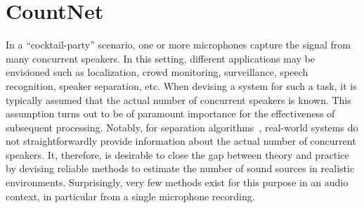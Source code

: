\chapter{CountNet}
\label{cha:countnet}



In a ``cocktail-party'' scenario, one or more microphones capture the signal from many concurrent speakers. In this setting, different applications may be envisioned such as localization, crowd monitoring, surveillance, speech recognition, speaker separation, etc.
When devising a system for such a task, it is typically assumed that the actual number of concurrent speakers is known.
This assumption turns out to be of paramount importance for the effectiveness of subsequent processing.
Notably, for separation algorithms~\cite{common10},
real-world systems do not straightforwardly provide information about the actual number of concurrent speakers.
It, therefore, is desirable to close the gap between theory and practice by devising reliable methods to estimate the number of sound sources in realistic environments.
Surprisingly, very few methods exist for this purpose in an audio context, in particular from a single microphone recording.


